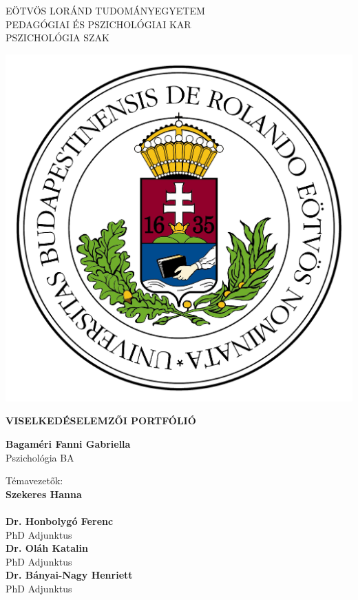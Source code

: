 \begin{titlepage}
\begin{center}
	EÖTVÖS LORÁND TUDOMÁNYEGYETEM \\
	PEDAGÓGIAI ÉS PSZICHOLÓGIAI KAR \\
	PSZICHOLÓGIA SZAK 
\end{center}


\begin{center}
	\includegraphics[scale=0.3]{images/elte_logo}
\end{center}

 \vfill

\begin{center}
\Huge
\textbf{VISELKEDÉSELEMZŐI PORTFÓLIÓ}
\normalsize
\end{center}

\vfill

\begin{minipage}[t]{0.6\linewidth}
\begin{flushleft}
	\vspace{2cm}
\textbf{Bagaméri Fanni Gabriella} \\
Pszichológia BA
\end{flushleft}
\end{minipage}
\begin{minipage}[t]{0.45\linewidth}
\begin{center}
	Témavezetők:\\
\textbf{Szekeres Hanna} \\
\SupervisorTitle \\
\textbf{Dr. Honbolygó Ferenc} \\
PhD Adjunktus \\
\textbf{Dr. Oláh Katalin} \\
PhD Adjunktus \\
\textbf{Dr. Bányai-Nagy Henriett} \\
PhD Adjunktus \\
\end{center}
\end{minipage}


\end{titlepage}
